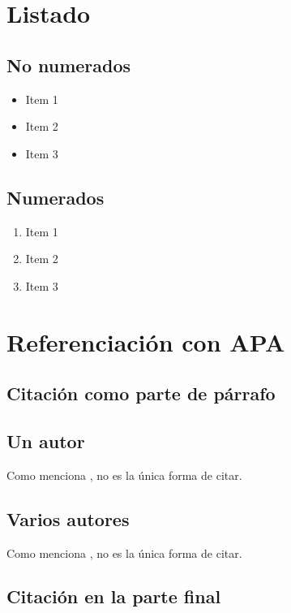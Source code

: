 \section{Listado}

\subsection{No numerados}
\begin{itemize}
    \item Item 1
    \item Item 2
    \item Item 3
\end{itemize}

\subsection{Numerados}
\begin{enumerate}
    \item Item 1
    \item Item 2
    \item Item 3
\end{enumerate}


\section{Referenciación con APA}

\subsection{Citación como parte de párrafo}

\subsection*{Un autor}

Como menciona , no es la única
forma de citar.\\

\subsection*{Varios autores}

Como menciona , no es la única
forma de citar.\\

\subsection{Citación en la parte final}

